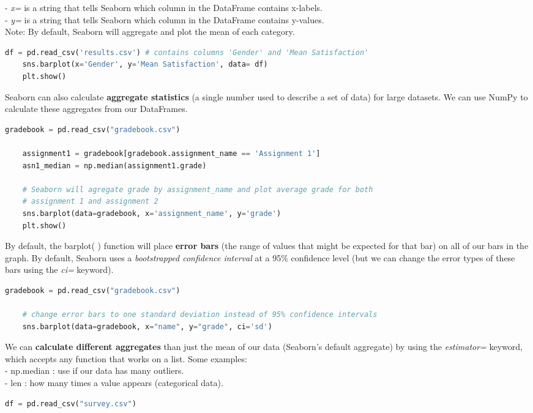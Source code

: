\documentclass[11pt, a4paper]{article}
\begin{document}
\begin{spacing}{1.1}
	\hspace*{3mm} - \textit{x=} is a string that tells Seaborn which column in the DataFrame contains x-labels. \\
	\hspace*{3mm} - \textit{y=} is a string that tells Seaborn which column in the DataFrame contains y-values. \\ 
	Note: By default, Seaborn will aggregate and plot the mean of each category. 
	\begin{lstlisting}[language=Python]
	df = pd.read_csv('results.csv') # contains columns 'Gender' and 'Mean Satisfaction'
	sns.barplot(x='Gender', y='Mean Satisfaction', data= df)
	plt.show()\end{lstlisting}\vspace*{1mm}
	Seaborn can also calculate \textbf{aggregate statistics} (a single number used to describe a set of data) for large datasets. We can use NumPy to calculate these aggregates from our DataFrames. 
	\begin{lstlisting}[language=Python]
	gradebook = pd.read_csv("gradebook.csv")
	
	assignment1 = gradebook[gradebook.assignment_name == 'Assignment 1']
	asn1_median = np.median(assignment1.grade)	
	
	# Seaborn will agregate grade by assignment_name and plot average grade for both 
	# assignment 1 and assignment 2
	sns.barplot(data=gradebook, x='assignment_name', y='grade')
	plt.show()\end{lstlisting}\vspace*{1mm}
	By default, the barplot( ) function will place \textbf{error bars} (the range of values that might be expected for that bar) on all of our bars in the graph. By default, Seaborn uses a \textit{bootstrapped confidence interval} at a 95\% confidence level (but we can change the error types of these bars using the \textit{ci=} keyword). 
	\begin{lstlisting}[language=Python]
	gradebook = pd.read_csv("gradebook.csv")
	
	# change error bars to one standard deviation instead of 95% confidence intervals
	sns.barplot(data=gradebook, x="name", y="grade", ci='sd')\end{lstlisting}\vspace*{1mm}
	We can \textbf{calculate different aggregates} than just the mean of our data (Seaborn's default aggregate) by using the \textit{estimator=} keyword, which accepts any function that works on a list. Some examples: \\
	\hspace*{3mm} - np.median : use if our data has many outliers. \\
	\hspace*{3mm} - len : how many times a value appears (categorical data). 
	\begin{lstlisting}[language=Python]
	df = pd.read_csv("survey.csv")
	

\end{lstlisting}
\end{spacing}
\end{document}
